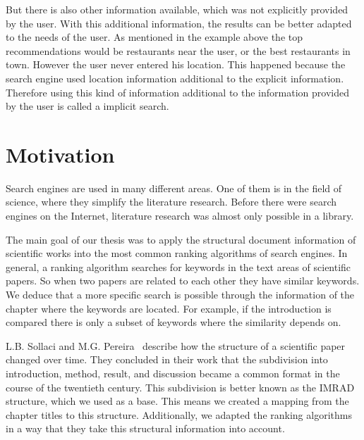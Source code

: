 But there is also other information available, which was not explicitly provided by the user. With this additional information, the results can be better adapted to the needs of the user. As mentioned in the example above the top recommendations would be restaurants near the user, or the best restaurants in town. However the user never entered his location. This happened because the search engine used location information additional to the explicit information. Therefore using this kind of information additional to the information provided by the user is called a implicit search.

\section{Motivation}
\label{sec:Motivation}

Search engines are used in many different areas. One of them is in the field of science, where they simplify the literature research. Before there were search engines on the Internet, literature research was almost only possible in a library.


The main goal of our thesis was to apply the structural document information of scientific works into the most common ranking algorithms of search engines. In general, a ranking algorithm searches for keywords in the text areas of scientific papers. So when two papers are related to each other they have similar keywords. We deduce that a more specific search is possible through the information of the chapter where the keywords are located. For example, if the introduction is compared there is only a subset of keywords where the similarity depends on.

 L.B. Sollaci and M.G. Pereira~\cite{Sollaci-The-2004} describe how the structure of a scientific paper changed over time. They concluded in their work that the subdivision into introduction, method, result, and discussion became a common format in the course of the twentieth century. This subdivision is better known as the IMRAD structure, which we used as a base. This means we created a mapping from the chapter titles to this structure. Additionally, we adapted the ranking algorithms in a way that they take this structural information into account.


